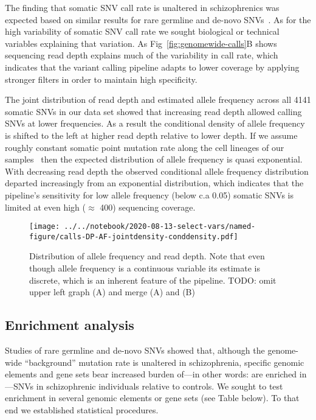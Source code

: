 \documentclass[letterpaper]{article}
\begin{document}
The finding that somatic SNV call rate is unaltered in schizophrenics was
expected based on similar results for rare germline and de-novo
SNVs~\citep{Purcell2014,Singh2017,Fromer2014,Rees2020}.
As for the high variability of somatic SNV call rate we sought 
biological or technical variables explaining that variation.  As
Fig~\ref{fig:genomewide-calls}B
shows sequencing read depth explains much of
the variability in call rate, which indicates that the variant calling
pipeline adapts to lower coverage by applying stronger filters in order to 
maintain high specificity.

The joint distribution of read depth and estimated allele frequency across all
4141 somatic SNVs in our data set showed that increasing read depth allowed
calling SNVs at lower frequencies.  As a result the conditional density of allele frequency is
shifted to the left at higher read depth relative to lower depth.  If we
assume roughly constant somatic point mutation rate along the cell lineages of
our samples~\citep{Rodin2021} then the expected distribution of allele
frequency is quasi exponential.  With decreasing read depth the observed
conditional allele frequency distribution departed increasingly from an
exponential distribution, which indicates that the pipeline's sensitivity for
low allele frequency (below c.a 0.05) somatic SNVs is limited at even high
(\(\approx\) 400) sequencing coverage.

\begin{figure}
\texttt{[image: ../../notebook/2020-08-13-select-vars/named-figure/calls-DP-AF-jointdensity-conddensity.pdf]}
\caption{Distribution of allele frequency and read depth.  Note that even though allele frequency is
a continuous variable its estimate is discrete, which is an inherent feature
of the pipeline.   TODO: omit upper
left graph (A) and merge (A) and (B)}
\end{figure}

\subsection*{Enrichment analysis}


Studies of rare germline and de-novo SNVs showed that,
although the genome-wide ``background'' mutation rate is unaltered in
schizophrenia, specific genomic elements and gene sets bear increased burden
of---in other words: are enriched in---SNVs in schizophrenic individuals relative to
controls.  We sought to test enrichment in several genomic elements or gene
sets (see Table below).  To that end we established statistical procedures.
\end{document}
